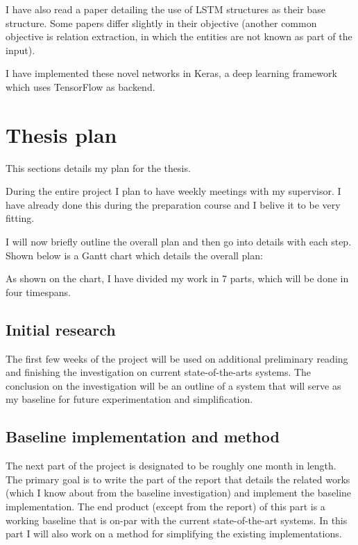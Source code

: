 \documentclass[12pt]{article}
\begin{document}
I have also read a paper detailing the use of LSTM structures as their base structure\cite{re_lstm}. Some papers differ slightly in their objective (another common objective is relation extraction, in which the entities are not known as part of the input).

I have implemented these novel networks in Keras, a deep learning framework which uses TensorFlow as backend\cite{keras}\cite{tensorflow}.  


\section{Thesis plan}

This sections details my plan for the thesis. 

During the entire project I plan to have weekly meetings with my supervisor. I have already done this during the preparation course and I belive it to be very fitting. 

I will now briefly outline the overall plan and then go into details with each step.
Shown below is a Gantt chart which details the overall plan:

\begin{center}
\end{center}

As shown on the chart, I have divided my work in 7 parts, which will be done in four timespans.

\subsection{Initial research}
 The first few weeks of the project will be used on additional preliminary reading and finishing the investigation on current state-of-the-arts
systems. The conclusion on the investigation will be an outline of a system that will serve
as my baseline for future experimentation and simplification. 

\subsection{Baseline implementation and method}
The next part of the project is designated to be roughly one month in length. The primary goal is to write the part of the report that details the related works (which I know about from the baseline investigation) and implement the baseline implementation. The end product (except from the report) of this part is a working baseline that is on-par with the current state-of-the-art systems. In this part I will also work on a method for simplifying the existing implementations. 
\end{document}
